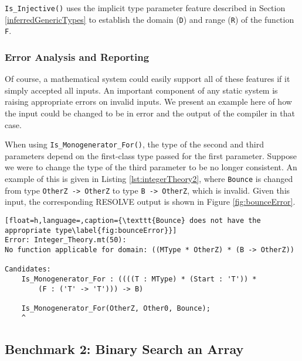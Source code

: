 \texttt{Is\_Injective()} uses the implicit type parameter feature described in Section \ref{inferredGenericTypes} to establish the domain (\texttt{D}) and range (\texttt{R}) of the function \texttt{F}.

		\subsubsection{Error Analysis and Reporting}	

Of course, a mathematical system could easily support all of these features if it simply accepted all inputs.  An important component of any static system is raising appropriate errors on invalid inputs.  We present an example here of how the input could be changed to be in error and the output of the compiler in that case.

When using \texttt{Is\_Monogenerator\_For()}, the type of the second and third parameters depend on the first-class type passed for the first parameter.  Suppose we were to change the type of the third parameter to be no longer consistent.  An example of this is given in Listing \ref{lst:integerTheory2}, where \texttt{Bounce} is changed from type \texttt{OtherZ -> OtherZ} to type \texttt{B -> OtherZ}, which is invalid.  Given this input, the corresponding RESOLVE output is shown in Figure \ref{fig:bounceError}.



\begin{lstlisting}[float=h,language=,caption={\texttt{Bounce} does not have the appropriate type\label{fig:bounceError}}]
Error: Integer_Theory.mt(50):
No function applicable for domain: ((MType * OtherZ) * (B -> OtherZ))

Candidates:
	Is_Monogenerator_For : ((((T : MType) * (Start : 'T')) * 
		(F : ('T' -> 'T'))) -> B)

	Is_Monogenerator_For(OtherZ, Other0, Bounce);
	^
\end{lstlisting}


	\subsection{Benchmark 2: Binary Search an Array}	

